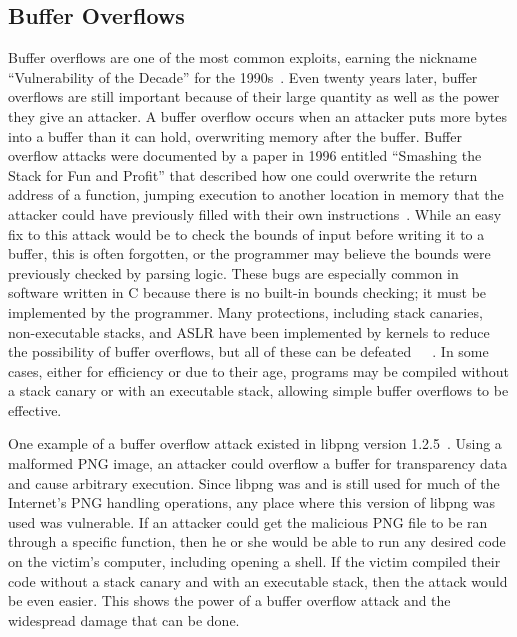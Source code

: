\subsection{Buffer Overflows}
\label{sec:bufferOverflows}
Buffer overflows are one of the most common exploits, earning the nickname ``Vulnerability of the Decade'' for the 1990s~\cite{cowan2000buffer}.  Even twenty years later, buffer overflows are still important because of their large quantity as well as the power they give an attacker.  A buffer overflow occurs when an attacker puts more bytes into a buffer than it can hold, overwriting memory after the buffer.  Buffer overflow attacks were documented by a paper in 1996 entitled ``Smashing the Stack for Fun and Profit'' that described how one could overwrite the return address of a function, jumping execution to another location in memory that the attacker could have previously filled with their own instructions~\cite{one1996smashing}.  While an easy fix to this attack would be to check the bounds of input before writing it to a buffer, this is often forgotten, or the programmer may believe the bounds were previously checked by parsing logic.  These bugs are especially common in software written in C because there is no built-in bounds checking; it must be implemented by the programmer.  Many protections, including stack canaries, non-executable stacks, and ASLR have been implemented by kernels to reduce the possibility of buffer overflows, but all of these can be defeated~\cite{richarte2002four}~\cite{shacham2007geometry}~\cite{evtyushkin2016jump}.  In some cases, either for efficiency or due to their age, programs may be compiled without a stack canary or with an executable stack, allowing simple buffer overflows to be effective.

One example of a buffer overflow attack existed in libpng version 1.2.5~\cite{CVE-2004-0597}.  Using a malformed PNG image, an attacker could overflow a buffer for transparency data and cause arbitrary execution.  Since libpng was and is still used for much of the Internet's PNG handling operations, any place where this version of libpng was used was vulnerable.  If an attacker could get the malicious PNG file to be ran through a specific function, then he or she would be able to run any desired code on the victim's computer, including opening a shell.  If the victim compiled their code without a stack canary and with an executable stack, then the attack would be even easier.  This shows the power of a buffer overflow attack and the widespread damage that can be done.

